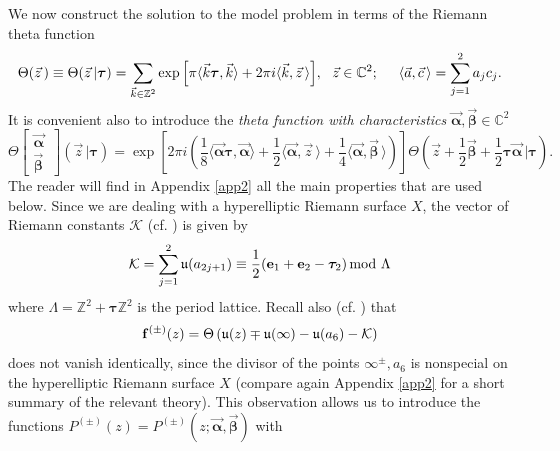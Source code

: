 \documentclass[10pt,oneside,reqno]{amsart}
\numberwithin{equation}{section}
\def\mod{\, \mathrm{mod}\,\,}
\begin{document}
We now construct the solution to the model problem in terms of the Riemann theta function
\begin{equation*}
  \Theta(\vec{z}\,)\equiv \Theta(\vec{z}\,|{\boldsymbol \tau}) = \sum_{\vec{k}\in\mathbb{Z}^2}\exp\Big[\pi\langle\vec{k}{\boldsymbol \tau},\vec{k}\rangle+2\pi i\langle \vec{k},\vec{z}\,\rangle\Big],
\ \ \vec{z}\in\mathbb{C}^2;\hspace{0.5cm} \langle\vec{a},\vec{c}\,\rangle = \sum_{j=1}^2a_jc_j.
\end{equation*}
It is convenient also to introduce the {\em theta function with characteristics} $\vec{\boldsymbol \alpha},\vec{\boldsymbol \beta}\in\mathbb{C}^2$
\begin{equation*}
  \Theta\begin{bmatrix}
         \vec{\boldsymbol \alpha}\,\\
\vec{\boldsymbol \beta}\,
        \end{bmatrix}(\vec{z}\,|{\boldsymbol \tau}) = \exp\left[2\pi i\left(\frac{1}{8}\langle\vec{\boldsymbol \alpha}{\boldsymbol \tau},\vec{\boldsymbol \alpha}\rangle+\frac{1}{2}\langle\vec{\boldsymbol \alpha},\vec{z}\,\rangle
+\frac{1}{4}\langle \vec{\boldsymbol \alpha},\vec{\boldsymbol \beta}\,\rangle\right)\right]\Theta\left(\vec{z}+\frac{1}{2}\vec{\boldsymbol \beta}+\frac{1}{2}{\boldsymbol \tau}\vec{\boldsymbol \alpha}\,\bigg|{\boldsymbol \tau}\right).
\end{equation*}
The reader will find in Appendix \ref{app2} all the main properties that are used below. Since we are dealing with a hyperelliptic Riemann surface $X$, the vector of Riemann constants $\mathcal{K}$ (cf. \cite{FK}) is given by
\begin{equation}
  \mathcal{K} = \sum_{j=1}^2\mathfrak{u}(a_{2j+1}) \equiv \frac{1}{2}({\bf e}_1+{\bf e}_2-{\boldsymbol \tau}_2) \mod \Lambda
  \label{RiemannK}
\end{equation}
where $\Lambda = \mathbb{Z}^2+{\boldsymbol \tau}\mathbb{Z}^2$ is the period lattice. Recall also (cf. \cite{FK}) that 
\begin{equation}\label{ass1}
  {\bf f}^{(\pm)}(z)=\Theta\left(\mathfrak{u}(z)\mp\mathfrak{u}(\infty)-\mathfrak{u}(a_6)-\mathcal{K}\right)
\end{equation}
does not vanish identically, since the divisor of the points $\infty^{\pm},a_6$ is nonspecial on the hyperelliptic Riemann surface $X$ (compare again Appendix \ref{app2} for a
short summary of the relevant theory). This observation allows us to introduce the functions $P^{(\pm)}(z) = P^{(\pm)}(z;\vec{\boldsymbol \alpha},\vec{\boldsymbol \beta})$ with
\end{document}
